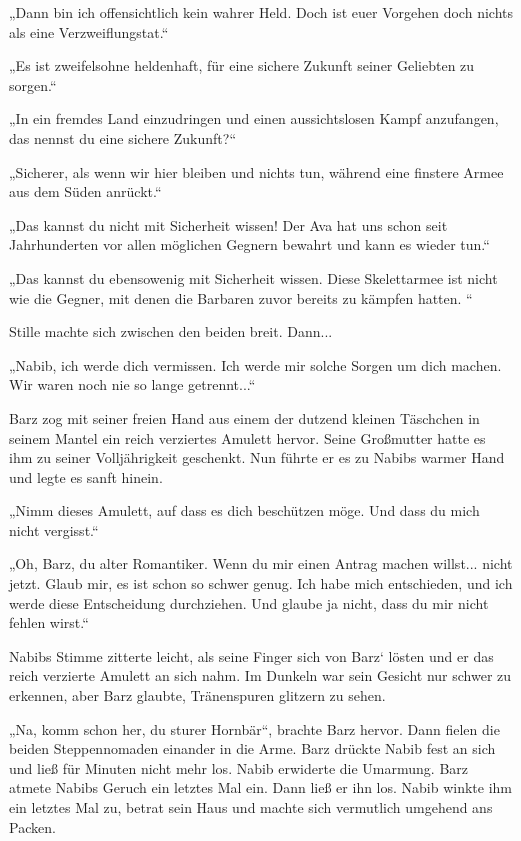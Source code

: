 „Dann bin ich offensichtlich kein wahrer Held. Doch ist euer Vorgehen doch nichts als eine Verzweiflungstat.“

„Es ist zweifelsohne heldenhaft, für eine sichere Zukunft seiner Geliebten zu sorgen.“

„In ein fremdes Land einzudringen und einen aussichtslosen Kampf anzufangen, das nennst du eine sichere Zukunft?“

„Sicherer, als wenn wir hier bleiben und nichts tun, während eine finstere Armee aus dem Süden anrückt.“

„Das kannst du nicht mit Sicherheit wissen! Der Ava hat uns schon seit Jahrhunderten vor allen möglichen Gegnern bewahrt und kann es wieder tun.“

„Das kannst du ebensowenig mit Sicherheit wissen. Diese Skelettarmee ist nicht wie die Gegner, mit denen die Barbaren zuvor bereits zu kämpfen hatten. “

Stille machte sich zwischen den beiden breit. Dann...

„Nabib, ich werde dich vermissen. Ich werde mir solche Sorgen um dich machen. Wir waren noch nie so lange getrennt...“

Barz zog mit seiner freien Hand aus einem der dutzend kleinen Täschchen in seinem Mantel ein reich verziertes Amulett hervor. Seine Großmutter hatte es ihm zu seiner Volljährigkeit geschenkt. Nun führte er es zu Nabibs warmer Hand und legte es sanft hinein.

„Nimm dieses Amulett, auf dass es dich beschützen möge. Und dass du mich nicht vergisst.“

„Oh, Barz, du alter Romantiker. Wenn du mir einen Antrag machen willst... nicht jetzt. Glaub mir, es ist schon so schwer genug. Ich habe mich entschieden, und ich werde diese Entscheidung durchziehen. Und glaube ja nicht, dass du mir nicht fehlen wirst.“

Nabibs Stimme zitterte leicht, als seine Finger sich von Barz‘ lösten und er das reich verzierte Amulett an sich nahm. Im Dunkeln war sein Gesicht nur schwer zu erkennen, aber Barz glaubte, Tränenspuren glitzern zu sehen.

„Na, komm schon her, du sturer Hornbär“, brachte Barz hervor. Dann fielen die beiden Steppennomaden einander in die Arme. Barz drückte Nabib fest an sich und ließ für Minuten nicht mehr los. Nabib erwiderte die Umarmung. Barz atmete Nabibs Geruch ein letztes Mal ein. Dann ließ er ihn los. Nabib winkte ihm ein letztes Mal zu, betrat sein Haus und machte sich vermutlich umgehend ans Packen.

